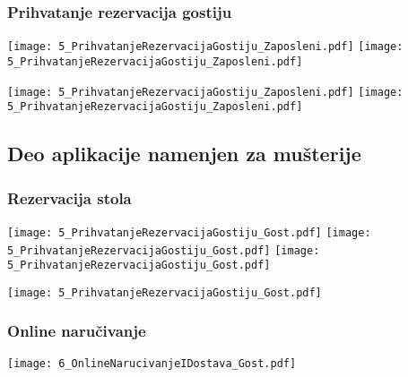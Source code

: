 \documentclass{article}
\begin{document}
\subsubsection{Prihvatanje rezervacija gostiju}
%

\texttt{[image: 5\_PrihvatanjeRezervacijaGostiju\_Zaposleni.pdf]}
\texttt{[image: 5\_PrihvatanjeRezervacijaGostiju\_Zaposleni.pdf]}

\texttt{[image: 5\_PrihvatanjeRezervacijaGostiju\_Zaposleni.pdf]}
\texttt{[image: 5\_PrihvatanjeRezervacijaGostiju\_Zaposleni.pdf]}
\vfill

\subsection{Deo aplikacije namenjen za mušterije}

\subsubsection{Rezervacija stola}
%

\texttt{[image: 5\_PrihvatanjeRezervacijaGostiju\_Gost.pdf]}
\texttt{[image: 5\_PrihvatanjeRezervacijaGostiju\_Gost.pdf]}
\texttt{[image: 5\_PrihvatanjeRezervacijaGostiju\_Gost.pdf]}

\texttt{[image: 5\_PrihvatanjeRezervacijaGostiju\_Gost.pdf]}

\subsubsection{Online naručivanje}
%


\texttt{[image: 6\_OnlineNarucivanjeIDostava\_Gost.pdf]}
\end{document}
